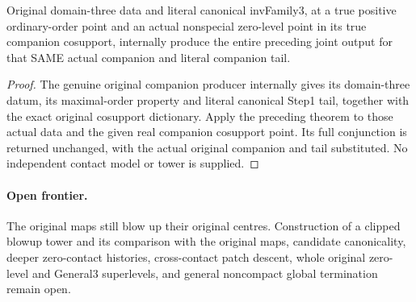 \begin{theorem}
\label{hir:zero-contact-general-three-clipped-centres}
\leanok
{}
Original domain-three data and literal canonical invFamily3, at a true positive
ordinary-order point and an actual nonspecial zero-level point in its true
companion cosupport, internally produce the entire preceding joint output
for that SAME actual companion and literal companion tail.
\end{theorem}
\begin{proof}
The genuine original companion producer internally gives its domain-three
datum, its maximal-order property and literal canonical Step1 tail, together
with the exact original cosupport dictionary. Apply the preceding theorem
to those actual data and the given real companion cosupport point. Its full
conjunction is returned unchanged, with the actual original companion and
tail substituted. No independent contact model or tower is supplied.
\end{proof}

\paragraph{Open frontier.}
The original maps still blow up their original centres. Construction of a
clipped blowup tower and its comparison with the original maps, candidate
canonicality, deeper zero-contact histories, cross-contact patch descent,
whole original zero-level and General3 superlevels, and general noncompact
global termination remain open.
